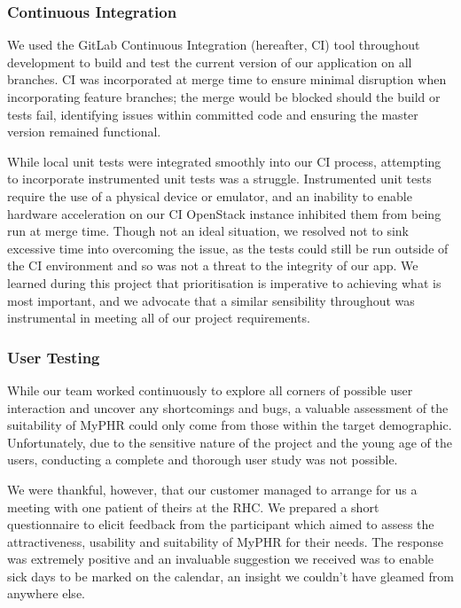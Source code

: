 \documentclass{l3proj}
\begin{document}
\subsubsection{Continuous Integration} \label{sec:3.5.3}
We used the GitLab Continuous Integration (hereafter, CI) tool \cite{gitlab-ci} throughout development to build and test the current version of our application on all branches. CI was incorporated at merge time to ensure minimal disruption when incorporating feature branches; the merge would be blocked should the build or tests fail, identifying issues within committed code and ensuring the master version remained functional.

While local unit tests were integrated smoothly into our CI process, attempting to incorporate instrumented unit tests was a struggle. Instrumented unit tests require the use of a physical device or emulator, and an inability to enable hardware acceleration on our CI OpenStack instance inhibited them from being run at merge time. Though not an ideal situation, we resolved not to sink excessive time into overcoming the issue, as the tests could still be run outside of the CI environment and so was not a threat to the integrity of our app. We learned during this project that prioritisation is imperative to achieving what is most important, and we advocate that a similar sensibility throughout was instrumental in meeting all of our project requirements. 


\subsubsection{User Testing} \label{sec:3.5.4}
While our team worked continuously to explore all corners of possible user interaction and uncover any shortcomings and bugs, a valuable assessment of the suitability of MyPHR could only come from those within the target demographic. Unfortunately, due to the sensitive nature of the project and the young age of the users, conducting a complete and thorough user study was not possible.

We were thankful, however, that our customer managed to arrange for us a meeting with one patient of theirs at the RHC. We prepared a short questionnaire to elicit feedback from the participant which aimed to assess the attractiveness, usability and suitability of MyPHR for their needs. The response was extremely positive and an invaluable suggestion we received was to enable sick days to be marked on the calendar, an insight we couldn't have gleamed from anywhere else.
\end{document}
